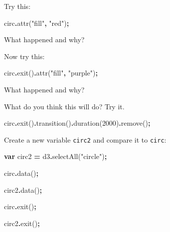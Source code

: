 \documentclass[
  openany]{book}
\newenvironment{Shaded}{\begin{snugshade}}{\end{snugshade}}
\newcommand{\DecValTok}[1]{\textcolor[rgb]{0.00,0.00,0.81}{#1}}
\newcommand{\FunctionTok}[1]{\textcolor[rgb]{0.00,0.00,0.00}{#1}}
\newcommand{\KeywordTok}[1]{\textcolor[rgb]{0.13,0.29,0.53}{\textbf{#1}}}
\newcommand{\NormalTok}[1]{#1}
\newcommand{\OperatorTok}[1]{\textcolor[rgb]{0.81,0.36,0.00}{\textbf{#1}}}
\newcommand{\StringTok}[1]{\textcolor[rgb]{0.31,0.60,0.02}{#1}}
\begin{document}
Try this:

\begin{Shaded}
\begin{Highlighting}[]
\NormalTok{circ}\OperatorTok{.}\FunctionTok{attr}\NormalTok{(}\StringTok{"fill"}\OperatorTok{,} \StringTok{"red"}\NormalTok{)}\OperatorTok{;}
\end{Highlighting}
\end{Shaded}

What happened and why?

Now try this:

\begin{Shaded}
\begin{Highlighting}[]
\NormalTok{circ}\OperatorTok{.}\FunctionTok{exit}\NormalTok{()}\OperatorTok{.}\FunctionTok{attr}\NormalTok{(}\StringTok{"fill"}\OperatorTok{,} \StringTok{"purple"}\NormalTok{)}\OperatorTok{;}
\end{Highlighting}
\end{Shaded}

What happened and why?

What do you think this will do? Try it.

\begin{Shaded}
\begin{Highlighting}[]
\NormalTok{circ}\OperatorTok{.}\FunctionTok{exit}\NormalTok{()}\OperatorTok{.}\FunctionTok{transition}\NormalTok{()}\OperatorTok{.}\FunctionTok{duration}\NormalTok{(}\DecValTok{2000}\NormalTok{)}\OperatorTok{.}\FunctionTok{remove}\NormalTok{()}\OperatorTok{;}
\end{Highlighting}
\end{Shaded}

Create a new variable \texttt{circ2} and compare it to \texttt{circ}:

\begin{Shaded}
\begin{Highlighting}[]
\KeywordTok{var}\NormalTok{ circ2 }\OperatorTok{=}\NormalTok{ d3}\OperatorTok{.}\FunctionTok{selectAll}\NormalTok{(}\StringTok{"circle"}\NormalTok{)}\OperatorTok{;}

\NormalTok{circ}\OperatorTok{.}\FunctionTok{data}\NormalTok{()}\OperatorTok{;}

\NormalTok{circ2}\OperatorTok{.}\FunctionTok{data}\NormalTok{()}\OperatorTok{;}

\NormalTok{circ}\OperatorTok{.}\FunctionTok{exit}\NormalTok{()}\OperatorTok{;}

\NormalTok{circ2}\OperatorTok{.}\FunctionTok{exit}\NormalTok{()}\OperatorTok{;}
\end{Highlighting}
\end{Shaded}
\end{document}
